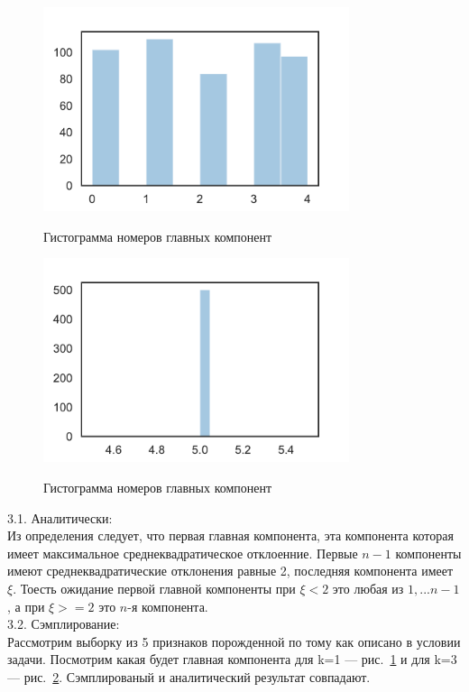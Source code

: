 \documentclass[12pt, twoside]{article}
\begin{document}
\begin{figure}[h!]\center
{\includegraphics[width=0.8\textwidth]{fifth_1}}
\caption{Гистограмма номеров главных компонент}
\label{fifth_1}
\end{figure}

\begin{figure}[h!]\center
{\includegraphics[width=0.8\textwidth]{fifth_3}}
\caption{Гистограмма номеров главных компонент}
\label{fifth_3}
\end{figure}

3.1. Аналитически:\\
Из определения следует, что первая главная компонента, эта компонента которая имеет максимальное среднеквадратическое отклоенние. Первые $n-1$ компоненты имеют среднеквадратические отклонения равные 2, последняя компонента имеет $\xi$. Тоесть ожидание первой главной компоненты при $\xi < 2$ это любая из $1,...n-1$, а при $\xi >= 2$ это $n$-я компонента.\\
	
3.2. Сэмплирование:\\
Рассмотрим выборку из 5 признаков порожденной по тому как описано в условии задачи. Посмотрим какая будет главная компонента для k=1 --- рис.~\ref{fifth_1} и для k=3 --- рис.~\ref{fifth_3}. Сэмплированый и аналитический результат совпадают. 
\end{document}
